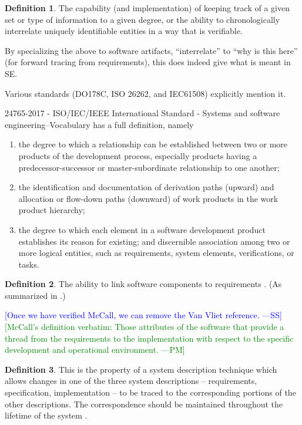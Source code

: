 \documentclass[letterpaper, cleveref]{lipics-v2019}
\newcommand{\authornote}[3]{\textcolor{#1}{[#3 ---#2]}}
\newcommand{\authornote}[3]{}
\newcommand{\wss}[1]{\authornote{blue}{SS}{#1}} %
\newcommand{\pmi}[1]{\authornote{green}{PM}{#1}} %
\theoremstyle{definition}
\newtheorem{defn}{Definition}
\begin{document}
\begin{defn}
  The capability (and implementation) of keeping track of a given set or
  type of information to a given degree, or the ability to chronologically
  interrelate uniquely identifiable entities in a way that is verifiable.
\end{defn}

By specializing the above to software artifacts, ``interrelate'' to ``why is
this here'' (for forward tracing from requirements), this does indeed give
what is meant in SE.

Various standards (DO178C, ISO 26262, and IEC61508) explicitly mention it.

24765-2017 - ISO/IEC/IEEE International Standard - Systems and software
engineering--Vocabulary has a full definition, namely
\begin{enumerate}
\item the degree to which a relationship can be established between two or more
  products of the development process, especially products having a
  predecessor-successor or master-subordinate relationship to one another;
\item the identification and documentation of derivation paths (upward) and
  allocation or flow-down paths (downward) of work products in the work product
  hierarchy;
\item the degree to which each element in a software development product
  establishes its reason for existing; and discernible association among two or
  more logical entities, such as requirements, system elements, verifications,
  or tasks.
\end{enumerate}

\begin{defn}
  The ability to link software components to requirements
  \citep{McCallEtAl1977}. (As summarized in \citet{VanVliet2000}.)
\end{defn} \wss{Once we have verified McCall, we can remove the Van Vliet
reference.}  \pmi{McCall's definition verbatim: Those attributes of the
software that provide a thread from the requirements to the implementation
with respect to the specific development and operational environment.}

\begin{defn}
This is the property of a system description technique which allows changes in one of the three system descriptions -- requirements, specification, implementation -- to be traced to the corresponding portions of the other descriptions. The correspondence should be maintained throughout the lifetime of the system \citep{greenspan1978structuring}.
\end{defn}
\end{document}
